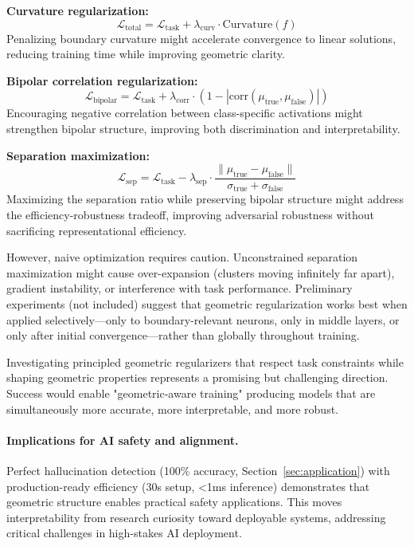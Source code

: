 \documentclass[11pt]{article}
\begin{document}
\textbf{Curvature regularization:}
\begin{equation}
\mathcal{L}_{\text{total}} = \mathcal{L}_{\text{task}} + \lambda_{\text{curv}} \cdot \text{Curvature}(f)
\end{equation}
Penalizing boundary curvature might accelerate convergence to linear solutions, reducing training time while improving geometric clarity.

\textbf{Bipolar correlation regularization:}
\begin{equation}
\mathcal{L}_{\text{bipolar}} = \mathcal{L}_{\text{task}} + \lambda_{\text{corr}} \cdot (1 - |\text{corr}(\mu_{\text{true}}, \mu_{\text{false}})|)
\end{equation}
Encouraging negative correlation between class-specific activations might strengthen bipolar structure, improving both discrimination and interpretability.

\textbf{Separation maximization:}
\begin{equation}
\mathcal{L}_{\text{sep}} = \mathcal{L}_{\text{task}} - \lambda_{\text{sep}} \cdot \frac{\|\mu_{\text{true}} - \mu_{\text{false}}\|}{\sigma_{\text{true}} + \sigma_{\text{false}}}
\end{equation}
Maximizing the separation ratio while preserving bipolar structure might address the efficiency-robustness tradeoff, improving adversarial robustness without sacrificing representational efficiency.

However, naive optimization requires caution. Unconstrained separation maximization might cause over-expansion (clusters moving infinitely far apart), gradient instability, or interference with task performance. Preliminary experiments (not included) suggest that geometric regularization works best when applied selectively—only to boundary-relevant neurons, only in middle layers, or only after initial convergence—rather than globally throughout training.

Investigating principled geometric regularizers that respect task constraints while shaping geometric properties represents a promising but challenging direction. Success would enable "geometric-aware training" producing models that are simultaneously more accurate, more interpretable, and more robust.

\paragraph{Implications for AI safety and alignment.}
Perfect hallucination detection (100\% accuracy, Section~\ref{sec:application}) with production-ready efficiency (30s setup, <1ms inference) demonstrates that geometric structure enables practical safety applications. This moves interpretability from research curiosity toward deployable systems, addressing critical challenges in high-stakes AI deployment.
\end{document}
